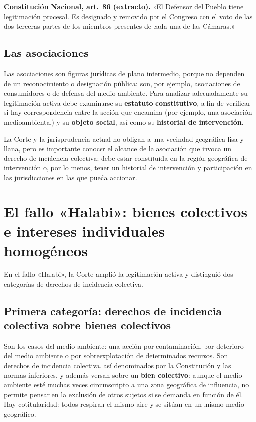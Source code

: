 \documentclass[12pt,oneside]{book}
\begin{document}
\begin{note}
\textbf{Constitución Nacional, art.\ 86 (extracto).} «El Defensor del Pueblo tiene legitimación procesal. Es designado y removido por el Congreso con el voto de las dos terceras partes de los miembros presentes de cada una de las Cámaras.»
\end{note}

\subsection{Las asociaciones}

Las asociaciones son figuras jurídicas de plano intermedio, porque no dependen de un reconocimiento o designación pública: son, por ejemplo, asociaciones de consumidores o de defensa del medio ambiente. Para analizar adecuadamente su legitimación activa debe examinarse su \textbf{estatuto constitutivo}, a fin de verificar si hay correspondencia entre la acción que encamina (por ejemplo, una asociación medioambiental) y su \textbf{objeto social}, así como su \textbf{historial de intervención}.

La Corte y la jurisprudencia actual no obligan a una vecindad geográfica lisa y llana, pero es importante conocer el alcance de la asociación que invoca un derecho de incidencia colectiva: debe estar constituida en la región geográfica de intervención o, por lo menos, tener un historial de intervención y participación en las jurisdicciones en las que pueda accionar.

\section{El fallo «Halabi»: bienes colectivos e intereses individuales homogéneos}

En el fallo «Halabi», la Corte amplió la legitimación activa y distinguió dos categorías de derechos de incidencia colectiva.

\subsection{Primera categoría: derechos de incidencia colectiva sobre bienes colectivos}

Son los casos del medio ambiente: una acción por contaminación, por deterioro del medio ambiente o por sobreexplotación de determinados recursos. Son derechos de incidencia colectiva, así denominados por la Constitución y las normas inferiores, y además versan sobre un \textbf{bien colectivo}: aunque el medio ambiente esté muchas veces circunscripto a una zona geográfica de influencia, no permite pensar en la exclusión de otros sujetos si se demanda en función de él. Hay cotitularidad: todos respiran el mismo aire y se sitúan en un mismo medio geográfico.
\end{document}
